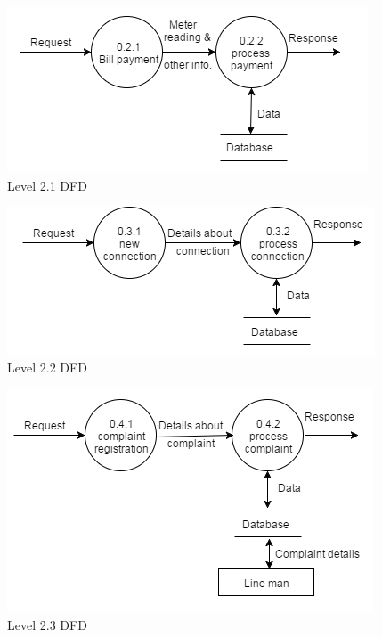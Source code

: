 \documentclass[12pt,a4paper,oneside]{report}
\begin{document}
      \begin{figure}[h]
        	\begin{center}
        		\includegraphics[scale=1.2]{level21.png}
        			\caption{Level 2.1 DFD}
        			\label{Level 2 DFD}
        	\end{center}
        \end{figure}
      \begin{figure}[h]
              	\begin{center}
              		\includegraphics[scale=1.2]{level22.png}
              			\caption{Level 2.2 DFD}
              			\label{Level 2 DFD}
              	\end{center}
              \end{figure}  
       \begin{figure}[h]
               	\begin{center}
               		\includegraphics[scale=1.2]{level23.png}
               			\caption{Level 2.3 DFD}
               			\label{Level 2.3 DFD}
               	\end{center}
               \end{figure}
\end{document}
